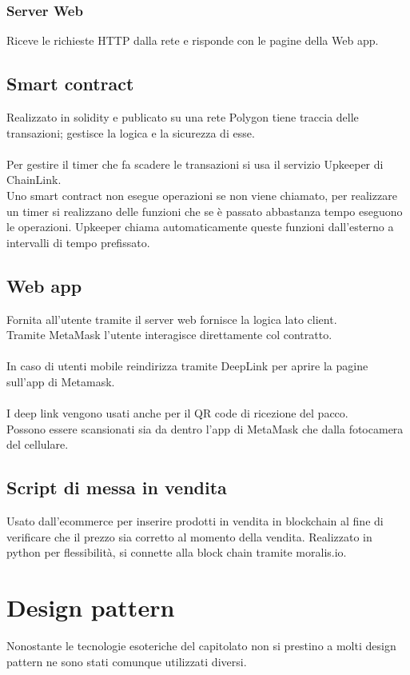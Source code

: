 \documentclass[a4paper, 12pt]{article}
\begin{document}
\subsubsection{Server Web}
Riceve le richieste HTTP dalla rete e risponde con le pagine della Web app.

\subsection{Smart contract}
Realizzato in solidity e publicato su una rete Polygon tiene traccia delle transazioni; gestisce la logica e la sicurezza di esse.\\\\
Per gestire il timer che fa scadere le transazioni si usa il servizio Upkeeper di ChainLink.\\
Uno smart contract non esegue operazioni se non viene chiamato, per realizzare un timer si realizzano delle funzioni che se è passato abbastanza tempo
eseguono le operazioni. Upkeeper chiama automaticamente queste funzioni dall'esterno a intervalli di tempo prefissato.

\subsection{Web app}
Fornita all'utente tramite il server web fornisce la logica lato client.\\
Tramite MetaMask l'utente interagisce direttamente col contratto.\\\\
In caso di utenti mobile reindirizza tramite DeepLink per aprire la pagine sull'app di Metamask.\\\\
I deep link vengono usati anche per il QR code di ricezione del pacco.\\
Possono essere scansionati sia da dentro l'app di MetaMask che dalla fotocamera del cellulare.

\subsection{Script di messa in vendita}
Usato dall'ecommerce per inserire prodotti in vendita in blockchain al fine di verificare che il prezzo sia corretto al momento della vendita.
Realizzato in python per flessibilità, si connette alla block chain tramite moralis.io.
\clearpage

\section{Design pattern}
Nonostante le tecnologie esoteriche del capitolato non si prestino a molti design pattern ne sono stati comunque utilizzati diversi.
\end{document}
